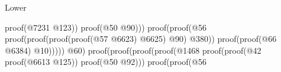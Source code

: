 \begin{lexlean}{Lower}
\begin{coremodule}
                                                                                                                    proof(@7231
                                                                                                                        @123))
                                                                                                                  proof(@50
                                                                                                                      @90)))
                                                                                                            proof(proof(@56
                                                                                                                  proof(proof(proof(proof(@57
                                                                                                                            @6623)
                                                                                                                          @6625)
                                                                                                                        @90)
                                                                                                                      @380))
                                                                                                                proof(proof(@66
                                                                                                                      @6384)
                                                                                                                    @10)))))
                                                                                                    @60)
                                                                                                  proof(proof(proof(proof(@1468
                                                                                                            proof(proof(@42
                                                                                                                  proof(@6613
                                                                                                                      @125))
                                                                                                                proof(@50
                                                                                                                    @92)))
                                                                                                          proof(proof(@56

\end{coremodule}
\end{lexlean}
